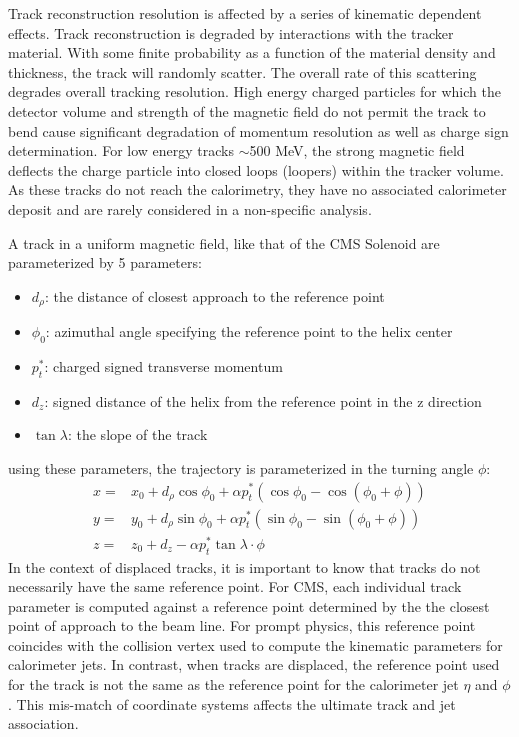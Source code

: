 Track reconstruction resolution is affected by a series of kinematic dependent effects. 
Track reconstruction is degraded by interactions with the tracker material. With some finite probability
as a function of the material density and thickness, the track will randomly scatter. The overall rate of this
 scattering degrades overall tracking resolution. 
High energy charged particles for which the detector volume and strength of the magnetic field do not
permit the track to bend cause significant degradation of momentum resolution as well 
as charge sign determination. For low energy tracks $\sim$500 MeV, the strong magnetic field
deflects the charge particle into closed loops (loopers) within the tracker volume. 
As these tracks do not reach the calorimetry, they have no associated calorimeter deposit and 
are rarely considered in a non-specific analysis.

A track in a uniform magnetic field, like that of the CMS Solenoid
are parameterized by 5 parameters:
\begin{itemize}
\item $d_{\rho}$: the distance of closest approach to the reference point
\item $\phi_0$: azimuthal angle specifying the reference point to the helix center 
\item  $p_t^*$: charged signed transverse momentum
\item  $d_z$: signed distance of the helix from the reference point in the z direction
\item $\tan \lambda$: the slope of the track 
\end{itemize}
using these parameters, the trajectory is parameterized in the turning angle $\phi$:
\begin{align*}
x =& x_0 + d_\rho \cos \phi_0 + \alpha p_{t}^* ( \cos \phi_0 - \cos(\phi_0 + \phi) ) \\
y =& y_0 + d_\rho \sin \phi_0 + \alpha p_{t}^* ( \sin \phi_0 - \sin(\phi_0 + \phi) ) \\
z =& z_0 + d_z - \alpha p_{t}^*  \tan \lambda \cdot \phi 
\end{align*}
In the context of displaced tracks, it is important to know that tracks do not necessarily 
have the same reference point. For CMS, each
individual track parameter is computed against a reference point determined by the the closest
point of approach to the beam line. For prompt physics, this reference point coincides with the
collision vertex used to compute the kinematic parameters for calorimeter jets. In contrast, when
tracks are displaced, the reference point used for the track is not the same as the reference point
for the calorimeter jet $\eta$ and $\phi$. This mis-match of coordinate systems affects the ultimate
track and jet association. 

